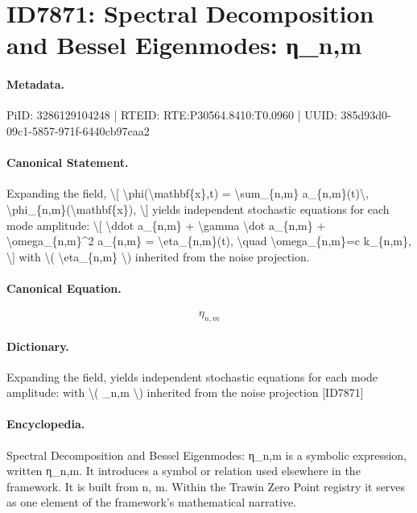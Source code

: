 \section*{ID7871: Spectral Decomposition and Bessel Eigenmodes: η\_n,m}
\paragraph{Metadata.}
PiID: 3286129104248 | RTEID: RTE:P30564.8410:T0.0960 | UUID: 385d93d0-09c1-5857-971f-6440cb97caa2

\paragraph{Canonical Statement.}
Expanding the field, \textbackslash{}[ \textbackslash{}phi(\textbackslash{}mathbf\{x\},t) = \textbackslash{}sum\_\{n,m\} a\_\{n,m\}(t)\textbackslash{}, \textbackslash{}phi\_\{n,m\}(\textbackslash{}mathbf\{x\}), \textbackslash{}] yields independent stochastic equations for each mode amplitude: \textbackslash{}[ \textbackslash{}ddot a\_\{n,m\} + \textbackslash{}gamma \textbackslash{}dot a\_\{n,m\} + \textbackslash{}omega\_\{n,m\}\textasciicircum{}2 a\_\{n,m\} = \textbackslash{}eta\_\{n,m\}(t), \textbackslash{}quad \textbackslash{}omega\_\{n,m\}=c k\_\{n,m\}, \textbackslash{}] with \textbackslash{}( \textbackslash{}eta\_\{n,m\} \textbackslash{}) inherited from the noise projection.

\paragraph{Canonical Equation.}
\[
\eta_{n,m}
\]

\paragraph{Dictionary.}
Expanding the field, yields independent stochastic equations for each mode amplitude: with \textbackslash{}( \_n,m \textbackslash{}) inherited from the noise projection [ID7871]

\paragraph{Encyclopedia.}
Spectral Decomposition and Bessel Eigenmodes: η\_n,m is a symbolic expression, written η\_n,m. It introduces a symbol or relation used elsewhere in the framework. It is built from n, m. Within the Trawin Zero Point registry it serves as one element of the framework's mathematical narrative.
